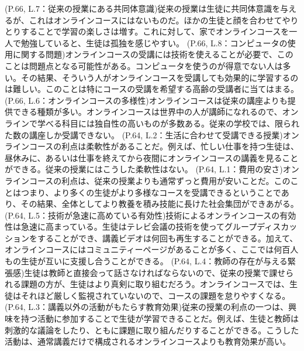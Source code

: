 \documentclass[uplatex,dvipdfmx,a4paper,10pt,oneside,openany]{jsarticle}
\begin{document}
\pagestyle{fancy}
\fancyfoot[L]{\thepage}
\fancyfoot[R]{\today}
(P.66, L.7：従来の授業にある共同体意識)従来の授業は生徒に共同体意識を与えるが、これはオンラインコースにはないものだ。ほかの生徒と顔を合わせてやりとりすることで学習の楽しさは増す。これに対して、家でオンラインコースを一人で勉強していると、生徒は孤独を感じやすい。
\vfill
(P.66, L.8：コンピュータの使用に関する問題)オンラインコースの受講には技術を使えることが必要で、このことは問題点となる可能性がある。コンピュータを使うのが得意でない人は多い。その結果、そういう人がオンラインコースを受講しても効果的に学習するのは難しい。このことは特にコースの受講を希望する高齢の受講者に当てはまる。
\vfill
(P.66, L.6：オンラインコースの多様性)オンラインコースは従来の講座よりも提供できる種類が多い。オンラインコースは世界中の人が講師になれるので、オンラインで学べる科目には独自性の高いものが多数ある。従来の学校では、限られた数の講座しか受講できない。
\vfill
(P.64, L.2：生活に合わせて受講できる授業)オンラインコースの利点は柔軟性があることだ。例えば、忙しい仕事を持つ生徒は、昼休みに、あるいは仕事を終えてから夜間にオンラインコースの講義を見ることができる。従来の授業にはこうした柔軟性はない。
\vfill
(P.64, L.1：費用の安さ)オンラインコースの利点は、従来の授業よりも通常ずっと費用が安いことだ。このことはつまり、より多くの生徒がより多様なコースを受講できるということであり、その結果、全体としてより教養を積み技能に長けた社会集団ができあがる。
\vfill
\newpage
(P.64, L.5：技術が急速に高めている有効性)技術によるオンラインコースの有効性は急速に高まっている。生徒はテレビ会議の技術を使ってグループディスカッションをすることができ、講義ビデオは何回も再生することができる。加えて、オンラインコースにはコミュニティーページがあることが多く、ここでは何百人もの生徒が互いに支援し合うことができる。
\vfill
(P.64, L.4：教師の存在が与える緊張感)生徒は教師と直接会って話さなければならないので、従来の授業で課せられる課題の方が、生徒はより真剣に取り組むだろう。オンラインコースでは、生徒はそれほど厳しく監視されていないので、コースの課題を怠りやすくなる。
\vfill
(P.64, L.3：講義以外の活動がもたらす教育効果)従来の授業の利点の一つは、興味を持つ活動に参加することで生徒が学習できることだ。例えば、生徒と教師は刺激的な議論をしたり、ともに課題に取り組んだりすることができる。こうした活動は、通常講義だけで構成されるオンラインコースよりも教育効果が高い。
\vfill
\end{document}
